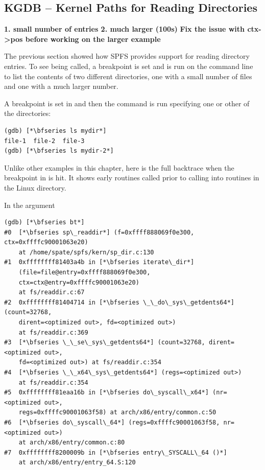 
\subsection{KGDB -- Kernel Paths for Reading Directories}

\textbf{
1. small number of entries
2. much larger (100s)
}
\textbf{Fix the issue with ctx->pos before working on the larger example}

The previous section showed how SPFS provides support for reading directory entries. To see  being called, a breakpoint is set and  is run on the command line to list the contents of two different directories, one with a small number of files and one with a much larger number. 

A breakpoint is set in  and then the  command is run specifying one or other of the directories:

\begin{lstlisting}
(gdb) [*\bfseries ls mydir*]
file-1  file-2  file-3
(gdb) [*\bfseries ls mydir-2*]
\end{lstlisting}

\noindent
Unlike other examples in this chapter, here is the full backtrace when the breakpoint in  is hit. It shows early routines called prior to calling into routines in the Linux  directory.

In  the  argument 

\begin{lstlisting}
(gdb) [*\bfseries bt*]
#0  [*\bfseries sp\_readdir*] (f=0xffff888069f0e300, ctx=0xffffc90001063e20)
    at /home/spate/spfs/kern/sp_dir.c:130
#1  0xffffffff81403a4b in [*\bfseries iterate\_dir*] 
    (file=file@entry=0xffff888069f0e300, 
    ctx=ctx@entry=0xffffc90001063e20) 
    at fs/readdir.c:67
#2  0xffffffff81404714 in [*\bfseries \_\_do\_sys\_getdents64*] (count=32768, 
    dirent=<optimized out>, fd=<optimized out>) 
    at fs/readdir.c:369
#3  [*\bfseries \_\_se\_sys\_getdents64*] (count=32768, dirent=<optimized out>, 
    fd=<optimized out>) at fs/readdir.c:354
#4  [*\bfseries \_\_x64\_sys\_getdents64*] (regs=<optimized out>) 
    at fs/readdir.c:354
#5  0xffffffff81eaa16b in [*\bfseries do\_syscall\_x64*] (nr=<optimized out>, 
    regs=0xffffc90001063f58) at arch/x86/entry/common.c:50
#6  [*\bfseries do\_syscall\_64*] (regs=0xffffc90001063f58, nr=<optimized out>)
    at arch/x86/entry/common.c:80
#7  0xffffffff8200009b in [*\bfseries entry\_SYSCALL\_64 ()*] 
    at arch/x86/entry/entry_64.S:120
\end{lstlisting}

